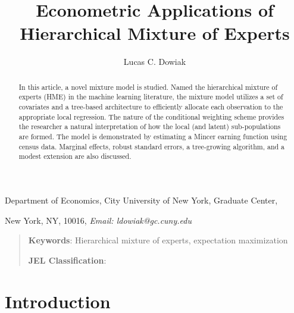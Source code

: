 \documentclass[12pt]{article}
\title{Econometric Applications of Hierarchical Mixture of Experts}
\author{Lucas C. Dowiak}
\begin{document}
 
\maketitle{}


Department of Economics, City University of New York\smallskip, Graduate
Center,

New York, NY, 10016, \textit{Email: ldowiak@gc.cuny.edu}

\qquad

\begin{abstract}
In this article, a novel mixture model is studied.
Named the hierarchical mixture of experts (HME) in the machine learning literature,
the mixture model utilizes a set of covariates and a tree-based architecture to
efficiently allocate each observation to the appropriate local regression.
The nature of the conditional weighting scheme provides the researcher a natural
interpretation of how the local (and latent) sub-populations are formed. The model is
demonstrated by estimating a Mincer earning function using census data. Marginal effects,
robust standard errors, a tree-growing algorithm, and a modest extension are also
discussed.

\end{abstract}

\vspace{1pt}

\begin{quotation}
\textbf{Keywords}: Hierarchical mixture of experts, expectation maximization

\textbf{JEL Classification}: 
\end{quotation}

\vspace{1pt}

\section{Introduction}
\end{document}
